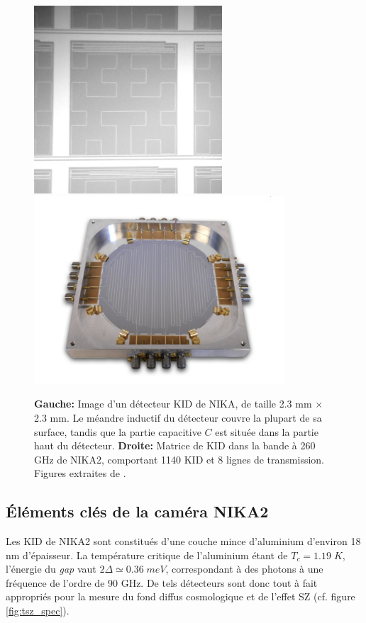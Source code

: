 \begin{figure}[t]
    \centering
    \includegraphics[height=7cm]{Figures/Chap_nk/fig3_AB.png}
    \includegraphics[height=7cm]{Figures/Chap_nk/1mm_array.jpeg}
    \caption{
        \textbf{Gauche:} Image d'un détecteur KID de NIKA, de taille 2.3 mm $\times$ 2.3 mm.
        Le méandre inductif du détecteur couvre la plupart de sa surface, tandis que la partie capacitive $C$ est située dans la partie haut du détecteur.
        \textbf{Droite:} Matrice de KID dans la bande à 260 GHz de NIKA2, comportant 1140 KID et 8 lignes de transmission.
        Figures extraites de \cite{adam_nika2_2018}.
    }
    \label{fig:nk_kids}
\end{figure}


\subsection{Éléments clés de la caméra NIKA2}

Les KID de NIKA2 sont constitués d'une couche mince d'aluminium d'environ 18 nm d'épaisseur.
La température critique de l'aluminium étant de $T_c = 1.19 \;\unit{K}$, l'énergie du \textit{gap} vaut $2\Delta \simeq 0.36 \;\unit{meV}$, correspondant à des photons à une fréquence de l'ordre de 90 GHz.
De tels détecteurs sont donc tout à fait appropriés pour la mesure du fond diffus cosmologique et de l'effet SZ (cf. figure \ref{fig:tsz_spec}).

